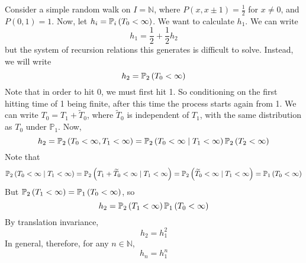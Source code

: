 \begin{example}
	Consider a simple random walk on \( I = \mathbb N \), where \( P(x,x\pm 1) = \frac{1}{2} \) for \( x \neq 0 \), and \( P(0,1) = 1 \).
	Now, let \( h_i = \mathbb{P}_{i}\left({T_0 < \infty}\right) \).
	We want to calculate \( h_1 \).
	We can write
	\[
		h_1 = \frac{1}{2} + \frac{1}{2} h_2
	\]
	but the system of recursion relations this generates is difficult to solve.
	Instead, we will write
	\[
		h_2 = \mathbb{P}_{2}\left({T_0 < \infty}\right)
	\]
	Note that in order to hit 0, we must first hit 1.
	So conditioning on the first hitting time of 1 being finite, after this time the process starts again from 1.
	We can write \( T_0 = T_1 + \widetilde T_0 \), where \( \widetilde T_0 \) is independent of \( T_1 \), with the same distribution as \( T_0 \) under \( \mathbb P_1 \).
	Now,
	\[
		h_2 = \mathbb{P}_{2}\left({T_0 < \infty, T_1 < \infty}\right) = \mathbb{P}_{2}\left({T_0 < \infty \mid T_1 < \infty}\right) \mathbb{P}_{2}\left({T_2 < \infty}\right)
	\]
	Note that
	\[
		\mathbb{P}_{2}\left({T_0 < \infty \mid T_1 < \infty}\right) = \mathbb{P}_{2}\left({T_1 + \widetilde T_0 < \infty \mid T_1 < \infty}\right) = \mathbb{P}_{2}\left({\widetilde T_0 < \infty \mid T_1 < \infty}\right) = \mathbb{P}_{1}\left({T_0 < \infty}\right)
	\]
	But \( \mathbb{P}_{2}\left({T_1 < \infty}\right) = \mathbb{P}_{1}\left({T_0 < \infty}\right) \), so
	\[
		h_2 = \mathbb{P}_{2}\left({T_1 < \infty}\right) \mathbb{P}_{1}\left({T_0 < \infty}\right)
	\]
	By translation invariance,
	\[
		h_2 = h_1^2
	\]
	In general, therefore, for any \( n \in \mathbb N \),
	\[
		h_n = h_1^n
	\]
\end{example}

